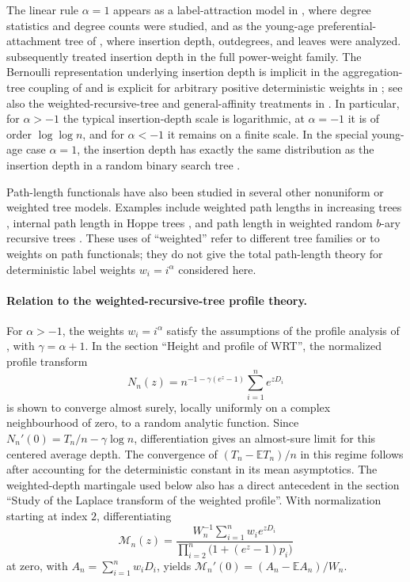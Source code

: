\documentclass[11pt,a4paper]{article}
\newcommand{\1}{\mathbf{1}}
\begin{document}
The linear rule $\alpha=1$ appears as a label-attraction model in
\citet{GalazkaEtAl2020}, where degree statistics and degree counts were
studied, and as the young-age preferential-attachment tree of
\citet{LyonMahmoud2020}, where insertion depth, outdegrees, and leaves were
analyzed.  \citet{LyonMahmoud2022} subsequently treated insertion depth in the
full power-weight family.  The Bernoulli representation underlying insertion
depth is implicit in the aggregation-tree coupling of
\citet[equation~(2.2)]{CurienHaas2017} and is explicit for arbitrary positive
deterministic weights in \citet[Corollary~8]{MaillerUribeBravo2019}; see also
the weighted-recursive-tree and general-affinity treatments in
\citet{Senizergues2021,NakataMahmoud2024}.  In particular, for
$\alpha>-1$ the typical insertion-depth scale is logarithmic, at
$\alpha=-1$ it is of order $\log\log n$, and for $\alpha<-1$ it remains on a
finite scale.  In the special young-age case $\alpha=1$, the insertion depth
has exactly the same distribution as the insertion depth in a random binary
search tree \citep{LyonMahmoud2020}.

Path-length functionals have also been studied in several other nonuniform or
weighted tree models.  Examples include weighted path lengths in increasing
trees \citep{KubaPanholzer2007}, internal path length in Hoppe trees
\citep{LeckeyNeininger2013}, and path length in weighted random $b$-ary
recursive trees \citep{MunsoniusRuschendorf2011}.  These uses of ``weighted''
refer to different tree families or to weights on path functionals; they do
not give the total path-length theory for deterministic label weights
$w_i=i^\alpha$ considered here.

\paragraph{Relation to the weighted-recursive-tree profile theory.}
For $\alpha>-1$, the weights $w_i=i^\alpha$ satisfy the assumptions of the
profile analysis of \citet{Senizergues2021}, with $\gamma=\alpha+1$.
In the section ``Height and profile of WRT'', the normalized profile transform
\[
  N_n(z)=n^{-1-\gamma(e^z-1)}\sum_{i=1}^n e^{zD_i}
\]
is shown to converge almost surely, locally uniformly on a complex
neighbourhood of zero, to a random analytic function.
Since $N_n'(0)=T_n/n-\gamma\log n$, differentiation gives an almost-sure
limit for this centered average depth. The convergence of
$(T_n-\mathbb{E}T_n)/n$ in this regime follows after accounting for the
deterministic constant in its mean asymptotics.
The weighted-depth martingale used below also has a direct antecedent in
the section ``Study of the Laplace transform of the weighted profile''.
With normalization starting at index $2$, differentiating
\[
  \mathcal{M}_n(z)=
  \frac{W_n^{-1}\sum_{i=1}^n w_i e^{zD_i}}
       {\prod_{i=2}^n\bigl(1+(e^z-1)p_i\bigr)}
\]
at zero, with $A_n=\sum_{i=1}^n w_iD_i$, yields
$\mathcal{M}_n'(0)=(A_n-\mathbb{E}A_n)/W_n$.
\end{document}
